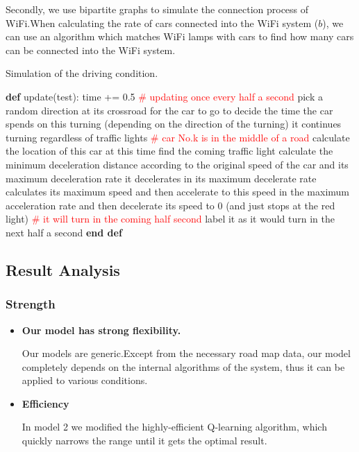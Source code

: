 \documentclass[12pt]{article}
\theoremstyle{definition}
\theoremstyle{remark}
\numberwithin{equation}{section}
\begin{document}
	    Secondly, we use bipartite graphs to simulate the connection process of WiFi.When calculating the rate of cars connected into the WiFi system ($b$), we can use an algorithm which matches WiFi lamps with cars to find how many cars can be connected into the WiFi system.
		
	
	
	\begin{algorithm}
		\caption{Simulation of the driving condition.}
		\label{type}
		\begin{algorithmic}
			\STATE \textbf{def} update(test):
			\STATE time += 0.5 \textcolor{red}{\# updating once every half a second}
			\STATE pick a random direction at its crossroad for the car to go to
			\STATE decide the time the car spends on this turning (depending on the direction of the turning)
			\ENDIF
			\STATE it continues turning regardless of traffic lights
			\ELSE
			\STATE \textcolor{red}{\# car No.k is in the middle of a road}
			\STATE calculate the location of this car at this time
			\STATE find the coming traffic light
			\STATE calculate the minimum deceleration distance according to the original  speed of the car and its maximum deceleration rate
			\STATE it decelerates in its maximum decelerate rate
			\ELSE
			\STATE calculates its maximum speed and then accelerate to this speed in the maximum acceleration rate and then decelerate its speed to 0 (and just stops at the red light)
			\ENDIF
			\ELSE
			\STATE \textcolor{red}{\# it will turn in the coming half second}
			\STATE label it as it would turn in the next half a second
			\ENDIF
			\ENDIF
			\ENDIF
			\ENDFOR
			\STATE \textbf{end def}
		\end{algorithmic}
	\end{algorithm}


	
	\newpage
	\subsection{Result Analysis}
	\subsubsection*{Strength}
	\begin{itemize}
		\item \textbf{Our model has strong flexibility.}
		
		Our models are generic.Except from the necessary road map data, our model completely depends on the internal algorithms of the system, thus it can be applied to various conditions.
		\item \textbf{Efficiency}
		
		In model 2 we modified the highly-efficient Q-learning algorithm, which quickly narrows the range until it gets the optimal result.
	\end{itemize}
	
\end{document}
